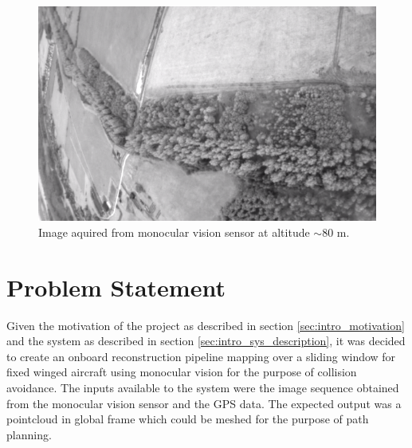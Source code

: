 \begin{figure}[htp]
\begin{center}
  \includegraphics[width=\textwidth]{images/sensor_image}
  \caption{Image aquired from monocular vision sensor at altitude $\sim$80 m.}
  \label{pic:sensor_image}
\end{center}
\end{figure}


\section{Problem Statement}
\label{sec:intro_prob_statement}
Given the motivation of the project as described in section \ref{sec:intro_motivation} and the system as described in section \ref{sec:intro_sys_description}, it was decided to create an onboard reconstruction pipeline mapping over a sliding window for fixed winged aircraft using monocular vision for the purpose of collision avoidance. The inputs available to the system were the image sequence obtained from the monocular vision sensor and the GPS data. The expected output was a pointcloud in global frame which could be meshed for the purpose of path planning.


